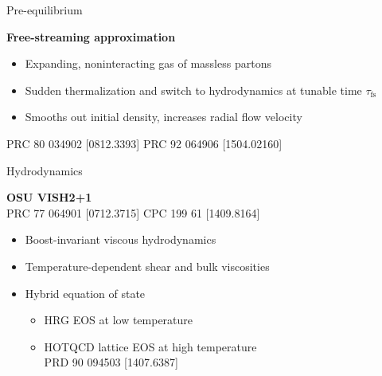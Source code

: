 \documentclass{beamer}
\begin{document}
\begin{frame}[t]{Pre-equilibrium}
  \begin{center}
    \bf Free-streaming approximation
  \end{center}
  \begin{itemize}
    \setlength{\itemsep}{1ex}
    \item Expanding, noninteracting gas of massless partons
    \item Sudden thermalization and switch to hydrodynamics at tunable time $\tau_\text{fs}$
    \item Smooths out initial density, increases radial flow velocity
  \end{itemize}
  \tiny\flushright PRC 80 034902 [0812.3393] \quad PRC 92 064906 [1504.02160]
\end{frame}

\begin{frame}[t]{Hydrodynamics}
  \vspace{-1ex}
  \begin{center}
    {\bf OSU VISH2+1} \\[1ex]
    \tiny
    PRC 77 064901 [0712.3715] \quad
    CPC 199 61 [1409.8164]
  \end{center}
  \vspace{-1ex}
  \begin{itemize}
    \setlength{\itemsep}{1ex}
    \item Boost-invariant viscous hydrodynamics
    \item Temperature-dependent shear and bulk viscosities
    \item Hybrid equation of state
      \begin{itemize}
        \item HRG EOS at low temperature
        \item HOTQCD lattice EOS at high temperature \\
          {\tiny PRD 90 094503 [1407.6387]}
      \end{itemize}
  \end{itemize}
\end{frame}
\end{document}
